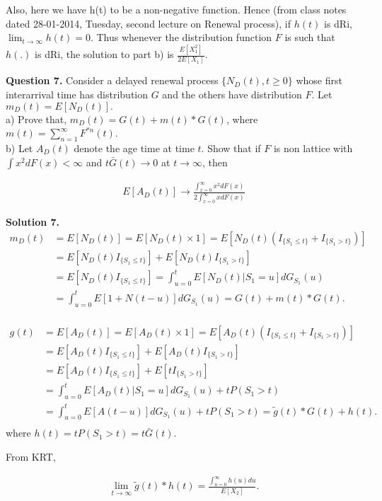 \documentclass[12,a4paper,onecolumn]{article}
\begin{document}
Also, here we have h(t) to be a non-negative function. Hence (from class notes dated 28-01-2014, Tuesday, second lecture on Renewal process), if $h(t)$ is dRi, $\lim_{t\rightarrow \infty}h(t)=0$. Thus whenever the distribution function $F$ is such that $h(.)$ is dRi, the solution to part b) is $\frac{E[X_1^2]}{2E[X_1]}$.

\textbf{Question 7.} Consider a delayed renewal process $\{N_D(t), t\geq 0\}$ whose first interarrival time has distribution $G$ and the others have distribution $F$. Let $m_D(t)=E[N_D(t)].$\\
a) Prove that, $m_D(t)=G(t)+m(t)*G(t)$, where $m(t)=\sum_{n=1}^{\infty}F^{*n}(t)$.\\
b) Let $A_D(t)$ denote the age time at time $t$. Show that if $F$ is non lattice with $\int x^2dF(x)<\infty$ and $t\bar{G}(t)\rightarrow 0$ at $t \rightarrow \infty$, then


\begin{align*}
E[A_D(t)] \rightarrow \frac{\int_{x=0}^{\infty}x^2dF(x)}{2\int_{x=0}^{\infty}xdF(x)}
\end{align*}

\textbf{Solution 7.} 
\begin{align*}
m_D(t)&=E[N_D(t)]=E[N_D(t)\times 1]=E[N_D(t)(I_{\{S_1\leq t\}}+I_{\{S_1>t\}})]\\
&=E[N_D(t)I_{\{S_1\leq t\}}]+E[N_D(t)I_{\{S_1>t\}}]\\
&=E[N_D(t)I_{\{S_1\leq t\}}]=\int_{u=0}^{t}E[N_D(t)|{S_1= u}]dG_{S_1}(u)\\
&=\int_{u=0}^{t}E[1+N(t-u)]dG_{S_1}(u)=G(t)+m(t)*G(t).\\
\end{align*}

\begin{align*}
g(t)&=E[A_D(t)]=E[A_D(t)\times 1]=E[A_D(t)(I_{\{S_1\leq t\}}+I_{\{S_1>t\}})]\\
&=E[A_D(t)I_{\{S_1\leq t\}}]+E[A_D(t)I_{\{S_1>t\}}]\\
&=E[A_D(t)I_{\{S_1\leq t\}}]+E[tI_{\{S_1>t\}}]\\
&=\int_{u=0}^{t}E[A_D(t)|{S_1= u}]dG_{S_1}(u)+tP(S_1>t)\\
&=\int_{u=0}^{t}E[A(t-u)]dG_{S_1}(u)+tP(S_1>t)=\tilde{g}(t)*G(t)+h(t).\\
\end{align*}
where $h(t)=tP(S_1>t)=t\bar{G}(t)$.

From KRT,

\begin{align*}
\lim_{t \rightarrow \infty} \tilde{g}(t)*h(t)=\frac{\int_{u=0}^{\infty}h(u)du}{E[X_2]}.\\
\end{align*}
\end{document}
